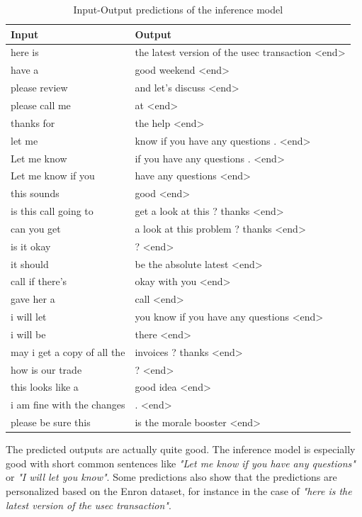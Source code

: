 \documentclass{article}
\begin{document}
\begin{table}[!htbp]
   \centering
   \begin{tabular}{ll}
     \toprule
     Input & Output \\
     \midrule
    here is & the latest version of the usec transaction <end> \\
    have a & good weekend <end> \\
    please review & and let's discuss <end> \\
    please call me & at <end> \\
    thanks for & the help <end> \\
    let me & know if you have any questions . <end> \\
    Let me know & if you have any questions . <end> \\
    Let me know if you & have any questions <end> \\
    this sounds & good <end> \\
    is this call going to & get a look at this ? thanks <end> \\
    can you get & a look at this problem ? thanks <end> \\
    is it okay & ? <end> \\
    it should & be the absolute latest <end> \\
    call if there's & okay with you <end> \\
    gave her a & call <end> \\
    i will let & you know if you have any questions <end> \\
    i will be & there <end> \\
    may i get a copy of all the & invoices ? thanks <end> \\
    how is our trade & ? <end> \\
    this looks like a & good idea <end> \\
    i am fine with the changes & . <end> \\
    please be sure this & is the morale booster <end> \\
     \bottomrule
   \end{tabular}
   \caption{Input-Output predictions of the inference model}
\end{table}

The predicted outputs are actually quite good. The inference model is especially good with short common sentences like \textit{"Let me know if you have any questions"} or \textit{"I will let you know"}. Some predictions also show that the predictions are personalized based on the Enron dataset, for instance in the case of \textit{"here is the latest version of the usec transaction"}.
\end{document}
